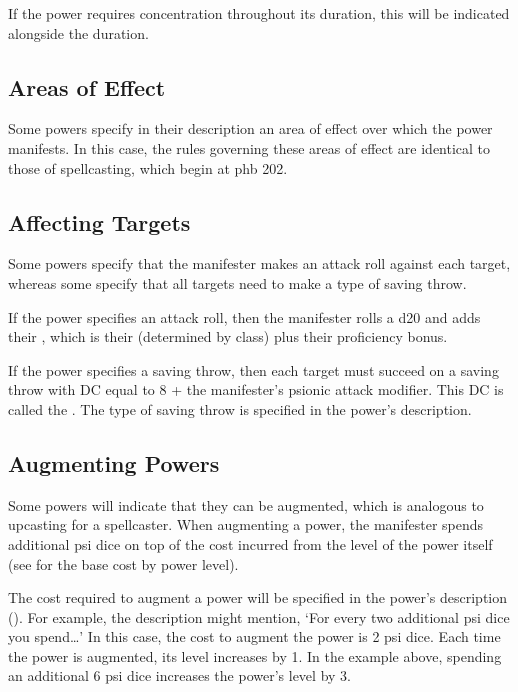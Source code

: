 If the power requires concentration throughout its duration,
this will be indicated alongside the duration.

\subsection{Areas of Effect}
Some powers specify in their description an area of effect
over which the power manifests.
In this case, the rules governing these areas of effect
are identical to those of spellcasting, which begin at
phb 202.

\subsection{Affecting Targets}
Some powers specify that the manifester makes an attack
roll against each target,
whereas some specify that all targets need to make
a type of saving throw.

If the power specifies an attack roll,
then the manifester rolls a d20
and adds their ,
which is their 
(determined by class)
plus their proficiency bonus.

If the power specifies a saving throw,
then each target must succeed on a saving throw
with DC equal to 8 + the manifester's psionic attack modifier.
This DC is called the .
The type of saving throw
is specified in the power's description.

\subsection{Augmenting Powers}
\label{sub:augmenting}
Some powers will indicate that they can be augmented,
which is analogous to upcasting for a spellcaster.
When augmenting a power,
the manifester spends additional psi dice on top of the cost
incurred from the level of the power itself
(see  for the base cost by power level).

The cost required to augment a power will be specified
in the power's description ().
For example, the description might mention,
`For every two additional psi dice you spend\dots'
In this case, the cost to augment the power is 2 psi dice.
Each time the power is augmented,
its level increases by 1.
In the example above,
spending an additional 6 psi dice increases the power's level by 3.

